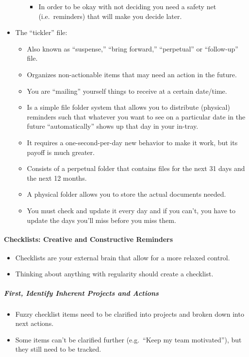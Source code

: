 \documentclass{article}
\begin{document}
\begin{itemize}
\begin{itemize}
\begin{itemize}
      \item In order to be okay with not deciding you need a safety net (i.e.\ reminders) that will make you decide later.
    \end{itemize}
  \end{itemize}
  \item The ``tickler'' file:
  \begin{itemize}
    \item Also known as ``suspense,'' ``bring forward,'' ``perpetual'' or ``follow-up'' file.
    \item Organizes non-actionable items that may need an action in the future.
    \item You are ``mailing'' yourself things to receive at a certain date/time.
    \item Is a simple file folder system that allows you to distribute (physical) reminders such that whatever you want to see on a particular date in the future ``automatically'' shows up that day in your in-tray.
    \item It requires a one-second-per-day new behavior to make it work, but its payoff is much greater.
    \item Consists of a perpetual folder that contains files for the next 31 days and the next 12 months.
    \item A physical folder allows you to store the actual documents needed.
    \item You must check and update it every day and if you can't, you have to update the days you'll miss before you miss them.
  \end{itemize}
\end{itemize}

\paragraph{Checklists: Creative and Constructive Reminders}

\begin{itemize}
  \item Checklists are your external brain that allow for a more relaxed control.
  \item Thinking about anything with regularity should create a checklist.
\end{itemize}

\subparagraph{First, Identify Inherent Projects and Actions}

\begin{itemize}
  \item Fuzzy checklist items need to be clarified into projects and broken down into next actions.
  \item Some items can't be clarified further (e.g.\ ``Keep my team motivated''), but they still need to be tracked.
\end{itemize}
\end{document}
